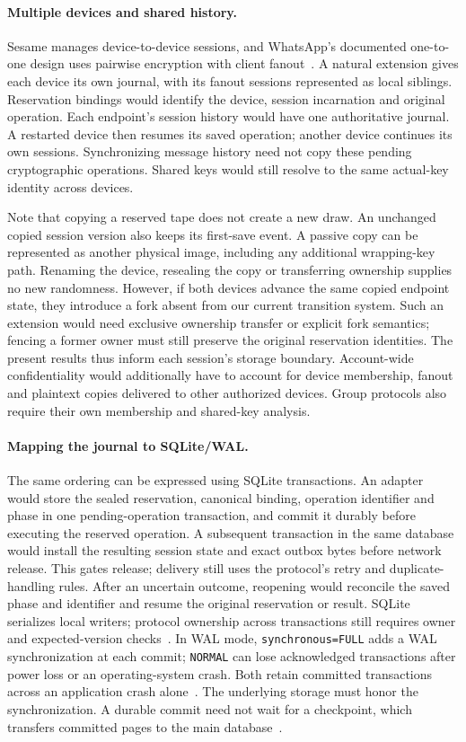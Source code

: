 \paragraph{Multiple devices and shared history.}
Sesame manages device-to-device sessions, and WhatsApp's documented
one-to-one design uses pairwise encryption with client
fanout~\cite{sesame2017,whatsapp2021multidevice}.
A natural extension gives each device its own journal, with its fanout
sessions represented as local siblings. Reservation bindings would identify
the device, session incarnation and original operation. Each endpoint's
session history would have one authoritative journal. A restarted device
then resumes its saved operation; another device continues its own
sessions. Synchronizing message history need not copy these pending
cryptographic operations. Shared keys would still resolve to the same
actual-key identity across devices.

Note that copying a reserved tape does not create a new draw.
An unchanged copied session version also keeps its first-save event.
A passive copy can be represented as another physical image, including any
additional wrapping-key path. Renaming the device, resealing the copy or
transferring ownership supplies no new randomness. However, if both devices advance
the same copied endpoint state, they introduce a fork absent from our
current transition system. Such an extension would need exclusive ownership
transfer or explicit fork semantics; fencing a former owner must still
preserve the original reservation identities. The present results thus
inform each session's storage boundary. Account-wide confidentiality would
additionally have to account for device membership, fanout and plaintext
copies delivered to other authorized devices. Group protocols also require
their own membership and shared-key analysis.

\paragraph{Mapping the journal to SQLite/WAL.}
The same ordering can be expressed using SQLite transactions. An adapter
would store the sealed reservation, canonical binding, operation identifier
and phase in one pending-operation transaction, and commit it durably before
executing the reserved operation. A subsequent transaction in the same
database would install the resulting session state and exact outbox bytes
before network release. This gates release; delivery still uses the
protocol's retry and duplicate-handling rules. After an uncertain outcome,
reopening would reconcile the saved phase and identifier and resume the
original reservation or result. SQLite serializes local writers; protocol
ownership across transactions still requires owner and expected-version
checks~\cite{sqliteTransactions}.
In WAL mode, \texttt{synchronous=FULL} adds a WAL synchronization at each
commit; \texttt{NORMAL} can lose acknowledged transactions after power loss
or an operating-system crash. Both retain committed transactions across an
application crash alone~\cite{sqliteSynchronous}. The underlying storage
must honor the synchronization. A durable commit need not wait for a
checkpoint, which transfers committed pages to the main
database~\cite{sqliteWal}.

